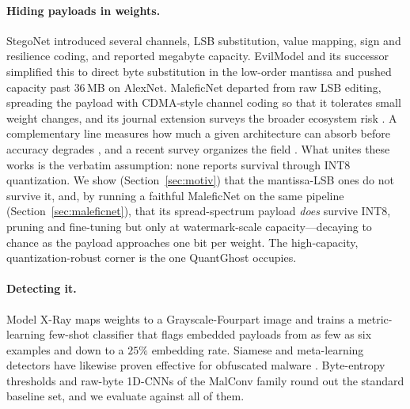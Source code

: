 \documentclass[a4paper,fleqn]{cas-dc}
\theoremstyle{plain}
\theoremstyle{remark}
\newcommand{\sys}{\mbox{QuantGhost}}
\begin{document}
\paragraph{Hiding payloads in weights.} StegoNet \cite{liu2020stegonet} introduced
several channels, LSB substitution, value mapping, sign and resilience coding,
and reported megabyte capacity. EvilModel \cite{wang2021evilmodel} and its successor
\cite{wang2022evilmodel2} simplified this to direct byte substitution in the
low-order mantissa and pushed capacity past $36$\,MB on AlexNet. MaleficNet
\cite{hitaj2022maleficnet} departed from raw LSB editing, spreading the payload with
CDMA-style channel coding so that it tolerates small weight changes, and its journal
extension surveys the broader ecosystem risk \cite{hitaj2025trust}. A complementary
line measures how much a given architecture can absorb before accuracy degrades
\cite{agrawal2023stegcapacity,zhang2023stegcapacity}, and a recent survey organizes
the field \cite{chaganti2021stegomalware}. What unites these works is the verbatim
assumption: none reports survival through INT8 quantization. We show
(Section~\ref{sec:motiv}) that the mantissa-LSB ones do not survive it, and, by running a
faithful MaleficNet on the same pipeline (Section~\ref{sec:maleficnet}), that its
spread-spectrum payload \emph{does} survive INT8, pruning and fine-tuning but only at
watermark-scale capacity---decaying to chance as the payload approaches one bit per weight.
The high-capacity, quantization-robust corner is the one \sys{} occupies.

\paragraph{Detecting it.} Model X-Ray \cite{gilkarov2026modelxray}
maps weights to a Grayscale-Fourpart image and trains a metric-learning
few-shot classifier \cite{snell2017prototypical,vinyals2016matching} that flags
embedded payloads from as few as six examples and down to a $25\%$ embedding rate.
Siamese and meta-learning detectors have likewise proven effective for obfuscated
malware \cite{zhu2023taskaware}. Byte-entropy thresholds and raw-byte 1D-CNNs of the
MalConv family round out the standard baseline set, and we evaluate against all of
them.
\end{document}

